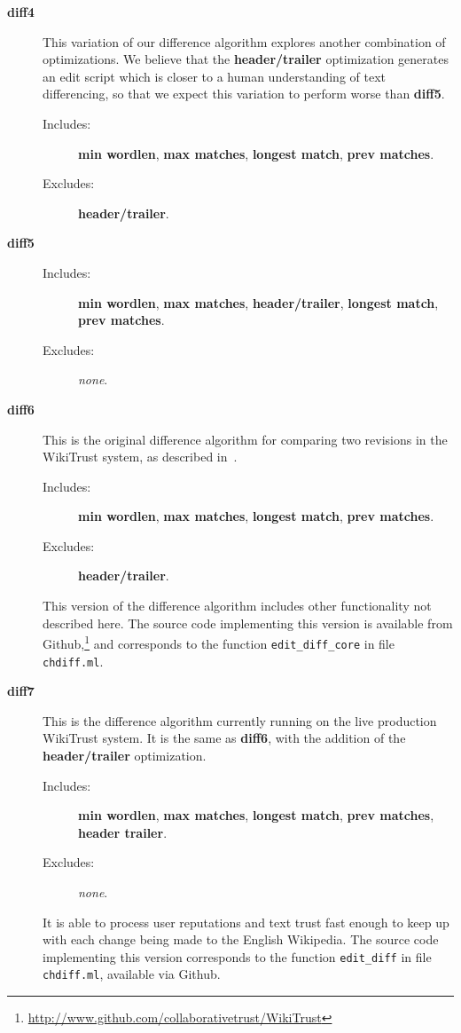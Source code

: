 \begin{description}
\item[\textbf{diff4}]
    This variation of our difference algorithm explores another
    combination of optimizations.
    We believe that the \textbf{header/trailer} optimization generates
    an edit script which is closer to a human understanding of text
    differencing, so that we expect this variation to perform worse
    than \textbf{diff5}.
    \begin{description}
    \item[Includes:]
	\textbf{min wordlen}, \textbf{max matches}, \textbf{longest match},
	\textbf{prev matches}.
    \item[Excludes:]
	\textbf{header/trailer}.
    \end{description}

\item[\textbf{diff5}]
    \begin{description}
    \item[Includes:]
	\textbf{min wordlen}, \textbf{max matches},
	\textbf{header/trailer}, \textbf{longest match},
	\textbf{prev matches}.
    \item[Excludes:] \textit{none}.
    \end{description}

\item[\textbf{diff6}] This is the original difference algorithm
    for comparing two revisions in the WikiTrust system, as
    described in~\cite{Adler2007}.
    \begin{description}
    \item[Includes:]
	\textbf{min wordlen}, \textbf{max matches}, \textbf{longest match},
	\textbf{prev matches}.
    \item[Excludes:]
	\textbf{header/trailer}.
    \end{description}
    This version of the difference algorithm includes other
    functionality not described here.
    The source code implementing this version is available from
    Github,\footnote{\url{http://www.github.com/collaborativetrust/WikiTrust}}
    and corresponds to the function \texttt{edit\_diff\_core} in
    file \texttt{chdiff.ml}.

\item[\textbf{diff7}]
    This is the difference algorithm currently running on the live
    production
    WikiTrust system.
    It is the same as \textbf{diff6}, with the addition of the
    \textbf{header/trailer} optimization.
    \begin{description}
    \item[Includes:]
	\textbf{min wordlen}, \textbf{max matches}, \textbf{longest match},
	\textbf{prev matches}, \textbf{header trailer}.
    \item[Excludes:] \textit{none}.
    \end{description}
    It is able to process user reputations and text trust fast enough
    to keep up with each change being made to the English Wikipedia.
    The source code implementing this version
    corresponds to the function \texttt{edit\_diff} in
    file \texttt{chdiff.ml}, available via Github.


\end{description}

